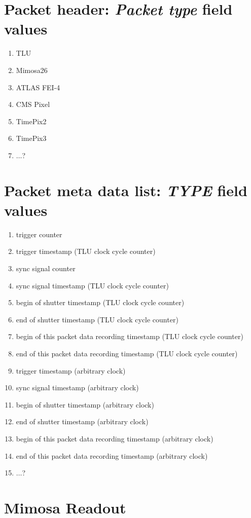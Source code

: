 \documentclass[paper=a4, fontsize=11pt]{scrartcl}	%
\numberwithin{equation}{section}		%
\numberwithin{figure}{section}			%
\numberwithin{table}{section}				%
\begin{document}
\newpage
\appendix

\section{Packet header: \emph{Packet type} field values}
\label{app:packettype}
\begin{enumerate}
\item TLU
\item Mimosa26
\item ATLAS FEI-4
\item CMS Pixel
\item TimePix2
\item TimePix3
\item $\ldots$?
\end{enumerate}

\section{Packet meta data list: \emph{TYPE} field values}
\label{app:typeid}
\begin{enumerate}
\item trigger counter
\item trigger timestamp (TLU clock cycle counter)
\item sync signal counter
\item sync signal timestamp (TLU clock cycle counter)
\item begin of shutter timestamp (TLU clock cycle counter)
\item end of shutter timestamp (TLU clock cycle counter)
\item begin of this packet data recording timestamp (TLU clock cycle counter)
\item end of this packet data recording timestamp (TLU clock cycle counter)
\item trigger timestamp (arbitrary clock)
\item sync signal timestamp (arbitrary clock)
\item begin of shutter timestamp (arbitrary clock)
\item end of shutter timestamp (arbitrary clock)
\item begin of this packet data recording timestamp (arbitrary clock)
\item end of this packet data recording timestamp (arbitrary clock)
\item $\ldots$?
\end{enumerate}

\section{Mimosa Readout}
\end{document}
